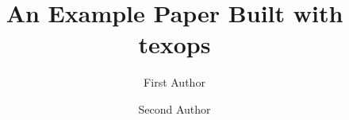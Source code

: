\documentclass[11pt]{article}
\title{An Example Paper Built with texops}
\author{First Author \and Second Author}
\date{}
\begin{document}
\maketitle

\begin{abstract}

\end{abstract}








\end{document}
